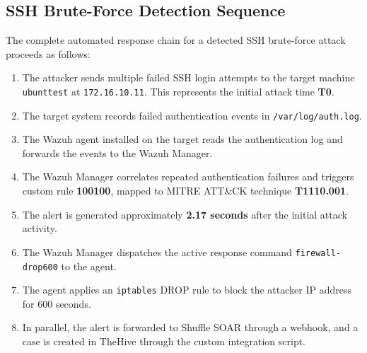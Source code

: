 \documentclass[12pt,a4paper]{report}
\begin{document}
\subsection{SSH Brute-Force Detection Sequence}

The complete automated response chain for a detected SSH brute-force attack proceeds as follows:

\begin{enumerate}
  \item The attacker sends multiple failed SSH login attempts to the target machine \texttt{ubunttest} at \texttt{172.16.10.11}. This represents the initial attack time \textbf{T0}.
  \item The target system records failed authentication events in \texttt{/var/log/auth.log}.
  \item The Wazuh agent installed on the target reads the authentication log and forwards the events to the Wazuh Manager.
  \item The Wazuh Manager correlates repeated authentication failures and triggers custom rule \textbf{100100}, mapped to MITRE ATT\&CK technique \textbf{T1110.001}.
  \item The alert is generated approximately \textbf{2.17 seconds} after the initial attack activity.
  \item The Wazuh Manager dispatches the active response command \texttt{firewall-drop600} to the agent.
  \item The agent applies an \texttt{iptables} DROP rule to block the attacker IP address for 600 seconds.
  \item In parallel, the alert is forwarded to Shuffle SOAR through a webhook, and a case is created in TheHive through the custom integration script.
\end{enumerate}
\end{document}
